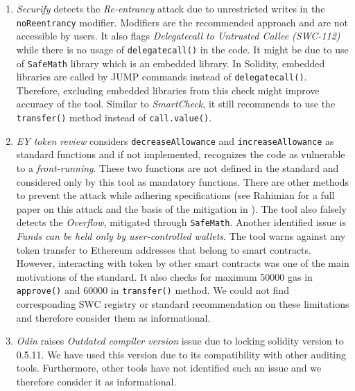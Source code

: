 \begin{enumerate}[noitemsep,topsep=0pt]
	\item \textit{Securify} detects the \textit{Re-entrancy} attack due to unrestricted writes in the \texttt{noReentrancy} modifier\cite{SECURIFY}. Modifiers are the recommended approach and are not accessible by users. It also flags \textit{Delegatecall to Untrusted Callee (SWC-112)} while there is no usage of \texttt{delegatecall()} in the code. It might be due to use of \texttt{SafeMath} library which is an embedded library. In Solidity, embedded libraries are called by JUMP commands instead of \texttt{delegatecall()}. Therefore, excluding embedded libraries from this check might improve accuracy of the tool. Similar to \textit{SmartCheck}, it still recommends to use the \texttt{transfer()} method instead of \texttt{call.value()}.

	\item \textit{EY token review} considers \texttt{decreaseAllowance} and \texttt{increaseAllowance} as standard \erc functions and if not implemented, recognizes the code as vulnerable to a \textit{front-running}. These two functions are not defined in the \erc standard\cite{ERC20Std} and considered only by this tool as mandatory functions. There are other methods to prevent the attack while adhering \erc specifications (see Rahimian \etal for a full paper on this attack and the basis of the mitigation in \sys\cite{ERC20MWA}). The tool also falsely detects the \textit{Overflow}, mitigated through \texttt{SafeMath}. Another identified issue is \textit{Funds can be held only by user-controlled wallets}. The tool warns against any token transfer to Ethereum addresses that belong to smart contracts. However, interacting with \erc token by other smart contracts was one of the main motivations of the standard. It also checks for maximum 50000 gas in \texttt{approve()} and 60000 in \texttt{transfer()} method. We could not find corresponding SWC registry or standard recommendation on these limitations and therefore consider them as informational.

	\item \textit{Odin} raises \textit{Outdated compiler version} issue due to locking solidity version to 0.5.11. We have used this version due to its compatibility with other auditing tools. Furthermore, other tools have not identified such an issue and we therefore consider it as informational.
\end{enumerate}

